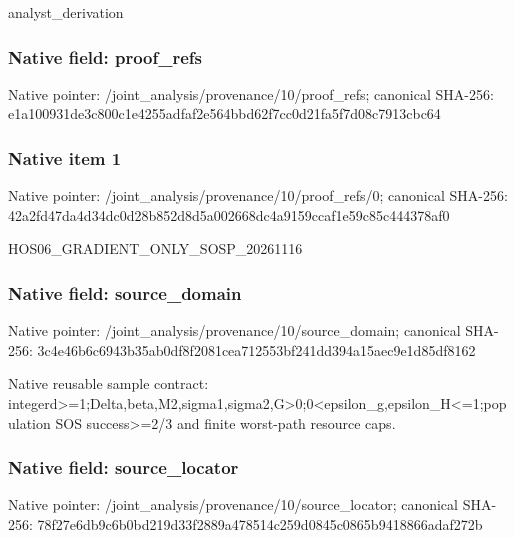\documentclass[10pt,a4paper]{article}
\begin{document}
\begingroup\raggedright\sloppy analyst\_\allowbreak{}derivation\par\endgroup

\subsubsection{Native field: proof\_\allowbreak{}refs}
Native pointer: /joint\_\allowbreak{}analysis/provenance/10/proof\_\allowbreak{}refs; canonical SHA-256: e1a100931de3c800c1e4255adfaf2e564bbd62f7cc0d21fa5f7d08c7913cbc64

\subsubsection{Native item 1}
Native pointer: /joint\_\allowbreak{}analysis/provenance/10/proof\_\allowbreak{}refs/0; canonical SHA-256: 42a2fd47da4d34dc0d28b852d8d5a002668dc4a9159ccaf1e59c85c444378af0

\begingroup\raggedright\sloppy HOS06\_\allowbreak{}GRADIENT\_\allowbreak{}ONLY\_\allowbreak{}SOSP\_\allowbreak{}20261116\par\endgroup

\subsubsection{Native field: source\_\allowbreak{}domain}
Native pointer: /joint\_\allowbreak{}analysis/provenance/10/source\_\allowbreak{}domain; canonical SHA-256: 3c4e46b6c6943b35ab0df8f2081cea712553bf241dd394a15aec9e1d85df8162

\begingroup\raggedright\sloppy Native reusable sample contract:\allowbreak{} integerd>=\allowbreak{}1;\allowbreak{}Delta,\allowbreak{}beta,\allowbreak{}M2,\allowbreak{}sigma1,\allowbreak{}sigma2,\allowbreak{}G>0;\allowbreak{}0<epsilon\_\allowbreak{}g,\allowbreak{}epsilon\_\allowbreak{}H<=\allowbreak{}1;\allowbreak{}population SOS success>=\allowbreak{}2/\allowbreak{}3 and finite worst-path resource caps.\par\endgroup

\subsubsection{Native field: source\_\allowbreak{}locator}
Native pointer: /joint\_\allowbreak{}analysis/provenance/10/source\_\allowbreak{}locator; canonical SHA-256: 78f27e6db9c6b0bd219d33f2889a478514c259d0845c0865b9418866adaf272b
\end{document}
